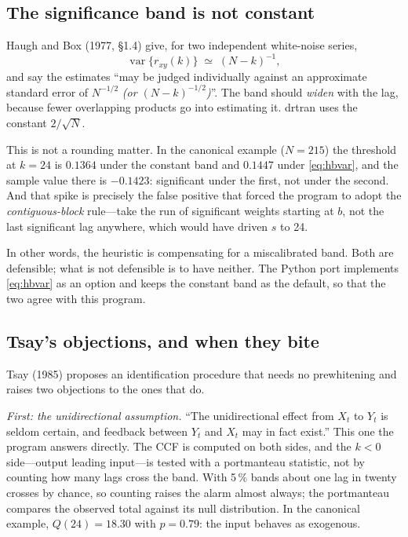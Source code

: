 \documentclass[11pt,a4paper]{article}
\theoremstyle{plain}
\theoremstyle{remark}
\begin{document}
\subsection{The significance band is not constant}
\label{sec:band}

Haugh and Box (1977, \S1.4) give, for two independent white-noise series,
\begin{equation}
 \operatorname{var}\{r_{xy}(k)\} \;\simeq\; (N-k)^{-1},
 \label{eq:hbvar}
\end{equation}
and say the estimates ``may be judged individually against an approximate
standard error of $N^{-1/2}$ \emph{(or $(N-k)^{-1/2}$)}''. The band should
\emph{widen} with the lag, because fewer overlapping products go into estimating
it. drtran uses the constant $2/\sqrt{N}$.

This is not a rounding matter. In the canonical example ($N=215$) the threshold
at $k=24$ is $0.1364$ under the constant band and $0.1447$ under
\eqref{eq:hbvar}, and the sample value there is $-0.1423$: significant under the
first, not under the second. And that spike is precisely the false positive that
forced the program to adopt the \emph{contiguous-block} rule---take the run of
significant weights starting at $b$, not the last significant lag anywhere, which
would have driven $s$ to 24.

In other words, the heuristic is compensating for a miscalibrated band. Both
are defensible; what is not defensible is to have neither. The Python port
implements \eqref{eq:hbvar} as an option and keeps the constant band as the
default, so that the two agree with this program.

\subsection{Tsay's objections, and when they bite}
\label{sec:tsay}

Tsay (1985) proposes an identification procedure that needs no prewhitening and
raises two objections to the ones that do.

\emph{First: the unidirectional assumption.} ``The unidirectional effect from
$X_t$ to $Y_t$ is seldom certain, and feedback between $Y_t$ and $X_t$ may in
fact exist.'' This one the program answers directly. The CCF is computed on both
sides, and the $k<0$ side---output leading input---is tested with a portmanteau
statistic, not by counting how many lags cross the band. With 5\,\% bands about
one lag in twenty crosses by chance, so counting raises the alarm almost always;
the portmanteau compares the observed total against its null distribution. In the
canonical example, $Q(24)=18.30$ with $p=0.79$: the input behaves as exogenous.
\end{document}
